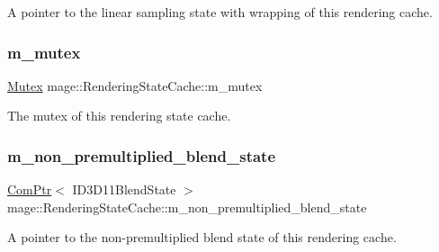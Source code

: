 A pointer to the linear sampling state with wrapping of this rendering cache. \hypertarget{structmage_1_1_rendering_state_cache_a97aad58b39eedbeeb27ed47c87ded52a}{}\label{structmage_1_1_rendering_state_cache_a97aad58b39eedbeeb27ed47c87ded52a} 
\subsubsection{\texorpdfstring{m\+\_\+mutex}{m\_mutex}}
{\footnotesize\ttfamily \hyperlink{structmage_1_1_mutex}{Mutex} mage\+::\+Rendering\+State\+Cache\+::m\+\_\+mutex\hspace{0.3cm}{\ttfamily [private]}}

The mutex of this rendering state cache. \hypertarget{structmage_1_1_rendering_state_cache_adaf1dd35ebb8e0ad9f2135ad0efee67a}{}\label{structmage_1_1_rendering_state_cache_adaf1dd35ebb8e0ad9f2135ad0efee67a} 
\subsubsection{\texorpdfstring{m\+\_\+non\+\_\+premultiplied\+\_\+blend\+\_\+state}{m\_non\_premultiplied\_blend\_state}}
{\footnotesize\ttfamily \hyperlink{namespacemage_ae74f374780900893caa5555d1031fd79}{Com\+Ptr}$<$ I\+D3\+D11\+Blend\+State $>$ mage\+::\+Rendering\+State\+Cache\+::m\+\_\+non\+\_\+premultiplied\+\_\+blend\+\_\+state\hspace{0.3cm}{\ttfamily [private]}}

A pointer to the non-\/premultiplied blend state of this rendering cache. \hypertarget{structmage_1_1_rendering_state_cache_ac655dae04386c2998677dff61704c975}{}\label{structmage_1_1_rendering_state_cache_ac655dae04386c2998677dff61704c975} 
